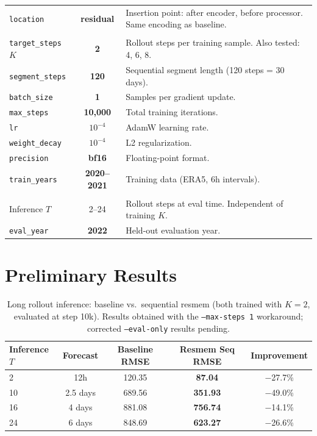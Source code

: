 \documentclass[11pt,a4paper]{article}
\begin{document}
\begin{table}[H]
\begin{tabular}{p{3.8cm}cp{6.5cm}}
\texttt{location} & \textbf{residual} & Insertion point: after encoder, before processor. Same encoding as baseline. \\
\addlinespace
\multicolumn{3}{l}{\textit{Training}} \\
\texttt{target\_steps} $K$ & \textbf{2} & Rollout steps per training sample. Also tested: 4, 6, 8. \\
\texttt{segment\_steps} & \textbf{120} & Sequential segment length (120 steps = 30 days). \\
\texttt{batch\_size} & \textbf{1} & Samples per gradient update. \\
\texttt{max\_steps} & \textbf{10,000} & Total training iterations. \\
\texttt{lr} & \textbf{$10^{-4}$} & AdamW learning rate. \\
\texttt{weight\_decay} & \textbf{$10^{-4}$} & L2 regularization. \\
\texttt{precision} & \textbf{bf16} & Floating-point format. \\
\texttt{train\_years} & \textbf{2020--2021} & Training data (ERA5, 6h intervals). \\
\addlinespace
\multicolumn{3}{l}{\textit{Inference}} \\
Inference $T$ & 2--24 & Rollout steps at eval time. Independent of training $K$. \\
\texttt{eval\_year} & \textbf{2022} & Held-out evaluation year. \\
\bottomrule
\end{tabular}
\end{table}

\section{Preliminary Results}

\begin{table}[H]
\centering
\caption{Long rollout inference: baseline vs.\ sequential resmem (both trained with $K{=}2$, evaluated at step 10k). Results obtained with the \texttt{--max-steps 1} workaround; corrected \texttt{--eval-only} results pending.}
\begin{tabular}{lcccc}
\toprule
Inference $T$ & Forecast & Baseline RMSE & Resmem Seq RMSE & Improvement \\
\midrule
2 & 12h & 120.35 & \textbf{87.04} & $-$27.7\% \\
10 & 2.5 days & 689.56 & \textbf{351.93} & $-$49.0\% \\
16 & 4 days & 881.08 & \textbf{756.74} & $-$14.1\% \\
24 & 6 days & 848.69 & \textbf{623.27} & $-$26.6\% \\
\bottomrule
\end{tabular}
\end{table}
\end{document}
